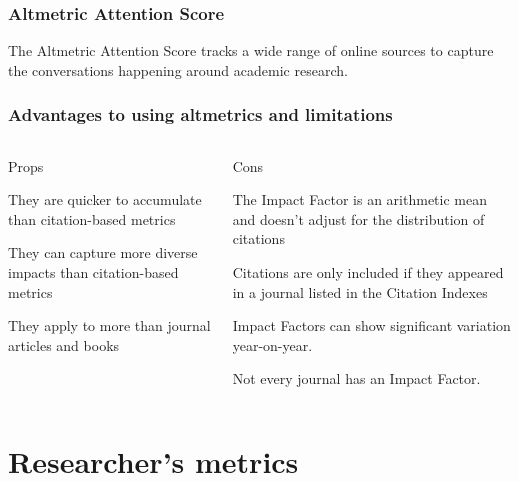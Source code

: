 \documentclass{beamer}
\begin{document}
\begin{frame}
    \frametitle{Altmetric Attention Score}
    The Altmetric Attention Score tracks a wide range of online sources to capture the conversations happening around academic research.
\end{frame}
\begin{frame}
    \frametitle{Advantages to using altmetrics and limitations}
    \begin{columns}[T]
        \begin{column}{.5\textwidth} \pause
            \centering Props
            \begin{propslist}
                \item They are quicker to accumulate than citation-based metrics  \pause
                \item They can capture more diverse impacts than citation-based metrics \pause              
                \item They apply to more than journal articles and books \pause
            \end{propslist}
        \end{column}
        \begin{column}{.5\textwidth}
            \centering Cons %
            \begin{conslist}
                \item The Impact Factor is an arithmetic mean and doesn’t adjust for the distribution of citations \pause
                \item Citations are only included if they appeared in a journal listed in the Citation Indexes \pause
                \item Impact Factors can show significant variation year-on-year.  \pause
                \item Not every journal has an Impact Factor.  \pause
            \end{conslist}
        \end{column}
    \end{columns}
\end{frame}

\section{Researcher's metrics}
\end{document}

